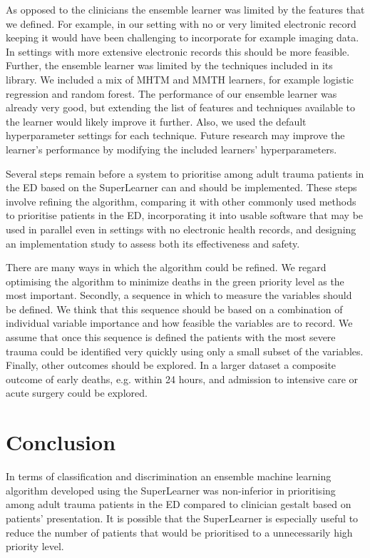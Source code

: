 \documentclass[10pt,letterpaper]{article}\usepackage[]{graphicx}\usepackage[]{color}
\begin{document}
As opposed to the clinicians the ensemble learner was limited by the features
that we defined. For example, in our setting with no or very limited electronic
record keeping it would have been challenging to incorporate for example imaging
data. In settings with more extensive electronic records this should be more
feasible. Further, the ensemble learner was limited by the techniques included
in its library. We included a mix of MHTM and MMTH learners, for example
logistic regression and random forest. The performance of our ensemble learner
was already very good, but extending the list of features and techniques
available to the learner would likely improve it further.  Also, we used the
default hyperparameter settings for each technique. Future research may improve
the learner's performance by modifying the included learners' hyperparameters.

Several steps remain before a system to prioritise among adult trauma patients in
the ED based on the SuperLearner can and should be implemented. These steps
involve refining the algorithm, comparing it with other commonly used methods to
prioritise patients in the ED, incorporating it into usable software that may be
used in parallel even in settings with no electronic health records, and
designing an implementation study to assess both its effectiveness and
safety.

There are many ways in which the algorithm could be refined. We regard
optimising the algorithm to minimize deaths in the green priority level as the
most important. Secondly, a sequence in which to measure the variables should be
defined. We think that this sequence should be based on a combination of
individual variable importance and how feasible the variables are to record. We
assume that once this sequence is defined the patients with the most severe
trauma could be identified very quickly using only a small subset of the
variables. Finally, other outcomes should be explored. In a larger dataset a
composite outcome of early deaths, e.g. within 24 hours, and admission to
intensive care or acute surgery could be explored.

\section*{Conclusion}
In terms of classification and discrimination an ensemble machine learning
algorithm developed using the SuperLearner was non-inferior in prioritising
among adult trauma patients in the ED compared to clinician gestalt based on
patients’ presentation. It is possible that the SuperLearner is especially
useful to reduce the number of patients that would be prioritised to a
unnecessarily high priority level.
\end{document}
